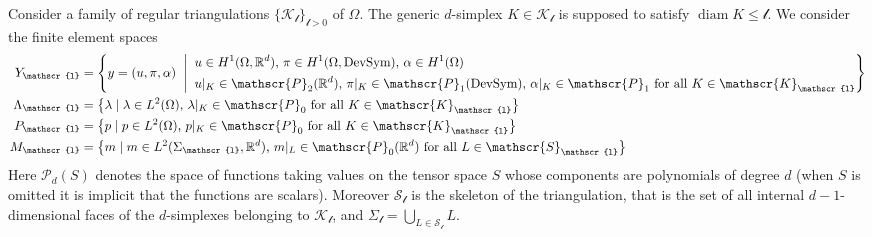 \documentclass[a4paper,10pt,oneside]{amsbook}
\numberwithin{section}{chapter}
\numberwithin{equation}{chapter}
\theoremstyle{definition}
\DeclareMathOperator{\diam}{diam}
\begin{document}
Consider a family of regular triangulations $\{\mathscr{K}_\mathscr{l}\}_{\mathscr{l}>0}$ of $\Omega$. The generic $d$-simplex $K\in\mathscr{K}_\mathscr{l}$ is supposed to satisfy $\diam K\le\mathscr{l}$. We consider the finite element spaces
\begin{align*}
Y_\mathscr{l}&=\Biggl\{y=(u,\pi,\alpha)\;\Biggm|\;
\begin{aligned}
& \text{$u\in H^1(\Omega,\mathbb{R}^d)$, $\pi\in H^1(\Omega,\text{DevSym})$, $\alpha\in H^1(\Omega)$} \\
& \text{$u|_K\in\mathscr{P}_2(\mathbb{R}^d)$, $\pi|_K\in\mathscr{P}_1(\text{DevSym})$, $\alpha|_K\in\mathscr{P}_1$ for all $K\in\mathscr{K}_\mathscr{l}$}
\end{aligned}\Biggr\} \\
\Lambda_\mathscr{l}&=\left\{\lambda\;|\;\text{$\lambda\in L^2(\Omega)$, $\lambda|_K\in\mathscr{P}_0$ for all $K\in\mathscr{K}_\mathscr{l}$}\right\} \\
P_\mathscr{l}&=\left\{p\;|\;\text{$p\in L^2(\Omega)$, $p|_K\in\mathscr{P}_0$ for all $K\in\mathscr{K}_\mathscr{l}$}\right\} \\
M_\mathscr{l}&=\left\{m\;|\;\text{$m\in L^2(\Sigma_\mathscr{l},\mathbb{R}^d)$, $m|_L\in\mathscr{P}_0(\mathbb{R}^d)$ for all $L\in\mathscr{S}_\mathscr{l}$}\right\}
\end{align*}
Here $\mathscr{P}_d(S)$ denotes the space of functions taking values on the tensor space $S$ whose components are polynomials of degree $d$ (when $S$ is omitted it is implicit that the functions are scalars). Moreover $\mathscr{S}_\mathscr{l}$ is the skeleton of the triangulation, that is the set of all internal $d-1$-dimensional faces of the $d$-simplexes belonging to $\mathscr{K}_\mathscr{l}$, and $\Sigma_\mathscr{l}=\bigcup_{L\in\mathscr{S}_\mathscr{l}}L$.
\end{document}

